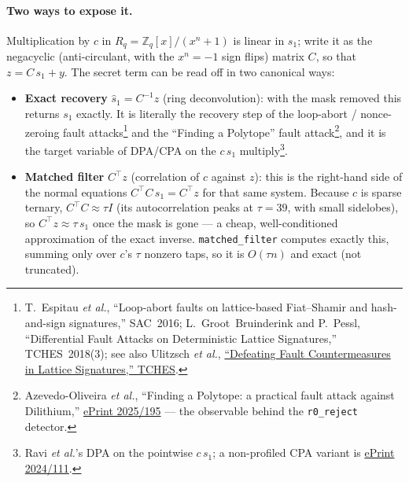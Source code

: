 \documentclass[11pt]{article}
\newcommand{\code}[1]{\texttt{#1}}
\newcommand{\Zq}{\ensuremath{\mathbb{Z}_q}}
\begin{document}
\paragraph{Two ways to expose it.} Multiplication by $c$ in $R_q=\Zq[x]/(x^n+1)$ is
linear in $s_1$; write it as the negacyclic (anti-circulant, with the $x^n=-1$ sign
flips) matrix $C$, so that $z = C\,s_1 + y$. The secret term can be read off in two
canonical ways:
\begin{itemize}[nosep]
\item \textbf{Exact recovery} $\hat s_1 = C^{-1} z$ (ring deconvolution): with the
mask removed this returns $s_1$ exactly. It is literally the recovery step of the
loop-abort / nonce-zeroing fault attacks\footnote{T.~Espitau \emph{et al.},
``Loop-abort faults on lattice-based Fiat--Shamir and hash-and-sign signatures,''
SAC~2016; L.~Groot~Bruinderink and P.~Pessl, ``Differential Fault Attacks on
Deterministic Lattice Signatures,'' TCHES~2018(3); see also Ulitzsch \emph{et al.},
\href{https://tches.iacr.org/index.php/TCHES/article/download/11170/10609/10798}{``Defeating
Fault Countermeasures in Lattice Signatures,'' TCHES}.} and the ``Finding a
Polytope'' fault attack\footnote{Azevedo-Oliveira \emph{et al.}, ``Finding a
Polytope: a practical fault attack against Dilithium,''
\href{https://eprint.iacr.org/2025/195}{ePrint 2025/195} --- the observable behind
the \code{r0\_reject} detector.}, and it is the target variable of DPA/CPA on the
$c\,s_1$ multiply\footnote{Ravi \emph{et al.}'s DPA on the pointwise $c\,s_1$; a
non-profiled CPA variant is \href{https://eprint.iacr.org/2024/111}{ePrint
2024/111}.}.
\item \textbf{Matched filter} $C^{\top} z$ (correlation of $c$ against $z$): this is
the right-hand side of the normal equations $C^{\top}C\,s_1 = C^{\top} z$ for that
same system. Because $c$ is sparse ternary, $C^{\top}C \approx \tau I$ (its
autocorrelation peaks at $\tau=39$, with small sidelobes), so
$C^{\top} z \approx \tau\,s_1$ once the mask is gone --- a cheap, well-conditioned
approximation of the exact inverse. \code{matched\_filter} computes exactly this,
summing only over $c$'s $\tau$ nonzero taps, so it is $O(\tau n)$ and exact (not
truncated).
\end{itemize}
\end{document}
